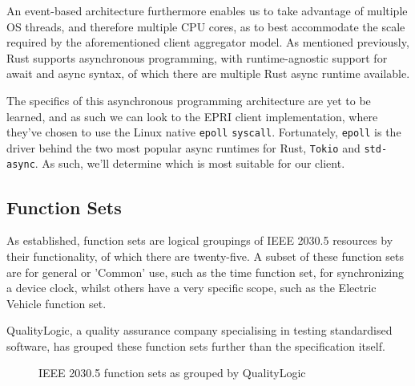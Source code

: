 An event-based architecture furthermore enables us to take advantage of multiple OS threads, and therefore multiple CPU cores, as to best accommodate the scale required by the aforementioned client aggregator model.
As mentioned previously, Rust supports asynchronous programming, with runtime-agnostic support for await and async syntax, of which there are multiple Rust async runtime available.

The specifics of this asynchronous programming architecture are yet to be learned, and as such we can look to the EPRI client implementation, where they've chosen to use the Linux native \texttt{epoll} \texttt{syscall}.
Fortunately, \texttt{epoll} is the driver behind the two most popular async runtimes for Rust, \texttt{Tokio} and \texttt{std-async}. As such, we'll determine which is most suitable for our client.

\subsection{Function Sets}
As established, function sets are logical groupings of IEEE 2030.5 resources by their functionality, of which there are twenty-five.
A subset of these function sets are for general or 'Common' use, such as the time function set, for synchronizing a device clock, whilst others have a very specific scope, such as the Electric Vehicle function set. 

QualityLogic, a quality assurance company specialising in testing standardised software, has grouped these function sets further than the specification itself.

\begin{figure}[H]
    \begin{center}
    \end{center}
    \caption{IEEE 2030.5 function sets as grouped by QualityLogic \cite[]{20305workshop}}
\end{figure}

